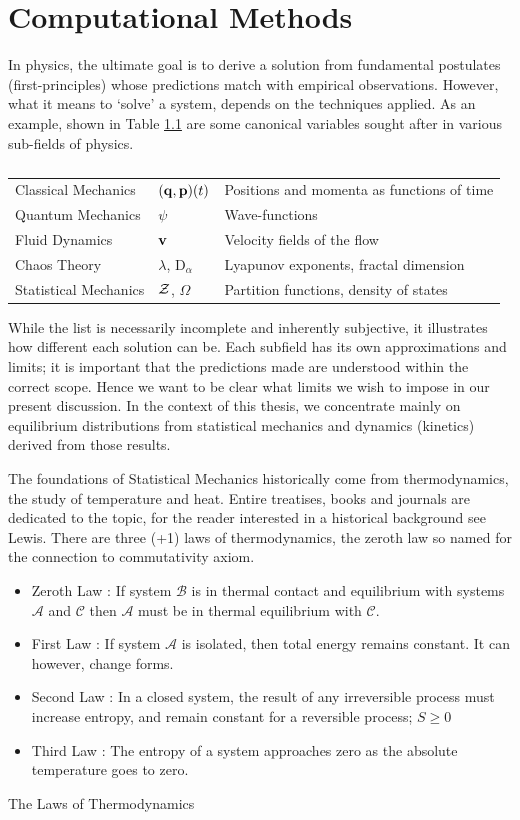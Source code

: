 \chapter{Computational Methods}
\label{chap:comp_methods}

In physics, the ultimate goal is to derive a solution from fundamental postulates (first-principles) whose predictions match with empirical observations. However, what it means to `solve' a system, depends on the techniques applied. As an example, shown in Table  \ref{table:types_of_physics_solutions} are some canonical variables sought after in various sub-fields of physics.
\begin{table}[!h]
  \begin{tabular}{l|l|l}             
    Classical Mechanics & $({\bf q},{\bf p}) (t)$ & Positions and momenta as functions of time \\
    Quantum  Mechanics  & $\psi$ & Wave-functions \\
    Fluid Dynamics & ${\bf v}$ & Velocity fields of the flow\\
    Chaos Theory & $\lambda$, $\text{D}_\alpha$ & Lyapunov exponents, fractal dimension \\
    Statistical Mechanics & $\mathcal{Z}$,  $\Omega$ & Partition functions, density of states
  \end{tabular}
  \caption{}
  \label{table:types_of_physics_solutions}
\end{table}
While the list is necessarily incomplete and inherently subjective, it illustrates how different each solution can be. Each subfield has its own approximations and limits; it is important that the predictions made are understood within the correct scope. Hence we want to be clear what limits we wish to impose in our present discussion. In the context of this thesis, we concentrate mainly on equilibrium distributions from statistical mechanics and dynamics (kinetics) derived from those results.

The foundations of Statistical Mechanics historically come from thermodynamics, the study of temperature and heat. Entire treatises, books and journals are dedicated to the topic, for the reader interested in a historical background see Lewis.\cite{lewis_heat_2007} There are three (+1) laws of thermodynamics, the zeroth law so named for the connection to commutativity axiom.  \newline
\epigraph{
  \begin{itemize}
  \item Zeroth Law : If system $\mathcal{B}$ is in thermal contact and equilibrium with systems $\mathcal{A}$ and $\mathcal{C}$ then $\mathcal{A}$ must be in thermal equilibrium with $\mathcal{C}$. 
  \item First Law : If system $\mathcal{A}$ is isolated, then total energy remains constant. It can however, change forms.
  \item Second Law : In a closed system, the result of any irreversible process must increase entropy, and remain constant for a reversible process; $S \ge 0$
  \item Third Law : The entropy of a system approaches zero as the absolute temperature goes to zero.
  \end{itemize}
}{The Laws of Thermodynamics}


